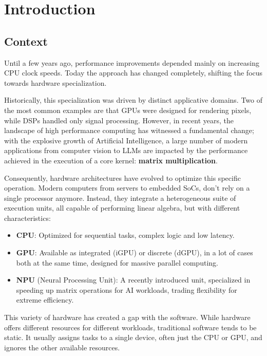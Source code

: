 \chapter{Introduction}

\section{Context}
Until a few years ago, performance improvements depended mainly on increasing CPU clock speeds. Today the approach has changed completely, shifting the focus towards hardware specialization.

Historically, this specialization was driven by distinct applicative domains. Two of the most common examples are that GPUs were designed for rendering pixels, while DSPs handled only signal processing. However, in recent years, the landscape of high performance computing has witnessed a fundamental change; with the explosive growth of Artificial Intelligence, a large number of modern applications from computer vision to LLMs are impacted by the performance achieved in the execution of a core  kernel: \textbf{matrix multiplication}.

Consequently, hardware architectures have evolved to optimize this specific operation. Modern computers from servers to embedded SoCs, don't rely on a single processor anymore. Instead, they integrate a heterogeneous suite of execution units, all capable of performing linear algebra, but with different characteristics:

\begin{itemize}
    \item \textbf{CPU}: Optimized for sequential tasks, complex logic and low latency.
    \item \textbf{GPU}: Available as integrated (iGPU) or discrete (dGPU), in a lot of cases both at the same time, designed for massive parallel computing.
    \item \textbf{NPU} (Neural Processing Unit): A recently introduced unit, specialized in speeding up matrix operations for AI workloads, trading flexibility for extreme efficiency.
\end{itemize}

This variety of hardware has created a gap with the software. While hardware offers different resources for different workloads, traditional software tends to be static. It usually assigns tasks to a single device, often just the CPU or GPU, and ignores the other available resources. 

